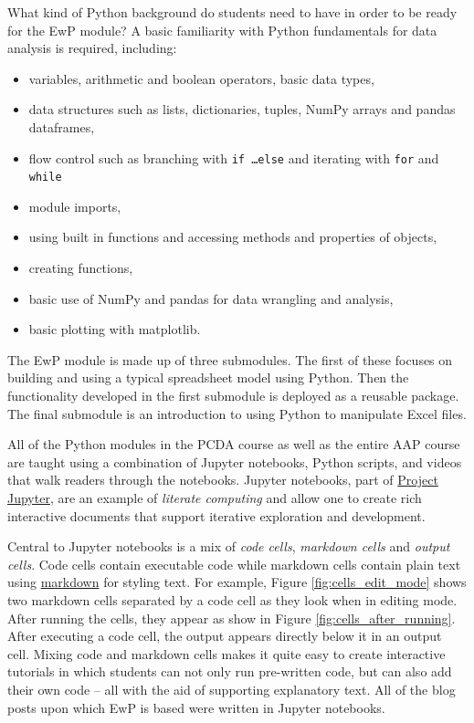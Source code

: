 \documentclass[ited,blindrev]{informs3}              %
\begin{document}
What kind of Python background do students need to have in order to be ready for the EwP module? A basic familiarity with Python fundamentals for data analysis is required, including:

\begin{itemize}
	\item variables, arithmetic and boolean operators, basic data types,
	\item data structures such as lists, dictionaries, tuples, NumPy arrays and pandas dataframes,
	\item flow control such as branching with \texttt{if \ldots else} and iterating with \texttt{for} and \texttt{while}
	\item module imports,
	\item using built in functions and accessing methods and properties of objects,
	\item creating functions,
	\item basic use of NumPy and pandas for data wrangling and analysis,
	\item basic plotting with matplotlib.
\end{itemize}

The EwP module is made up of three submodules. The first of these focuses on building and using a typical spreadsheet model using Python. Then the functionality developed in the first submodule is deployed as a reusable package. The final submodule is an introduction to using Python to manipulate Excel files.

All of the Python modules in the PCDA course as well as the entire AAP course are taught using a combination of Jupyter notebooks, Python scripts, and videos that walk readers through the notebooks. Jupyter notebooks, part of \href{https://jupyter.org/}{Project Jupyter}, are an example of \textit{literate computing} \cite{perez2015project} and allow one to create rich interactive documents that support iterative exploration and development. 

Central to Jupyter notebooks is a mix of \textit{code cells}, \textit{markdown cells} and \textit{output cells}. Code cells contain executable code while markdown cells contain plain text using \href{URL}{markdown} for styling text. For example, Figure \ref{fig:cells_edit_mode} shows two markdown cells separated by a code cell as they look when in editing mode. After running the cells, they appear as show in Figure \ref{fig:cells_after_running}. After executing a code cell, the output appears directly below it in an output cell. Mixing code and markdown cells makes it quite easy to create interactive tutorials in which students can not only run pre-written code, but can also add their own code -- all with the aid of supporting explanatory text. All of the blog posts upon which EwP is based were written in Jupyter notebooks. 
\end{document}
